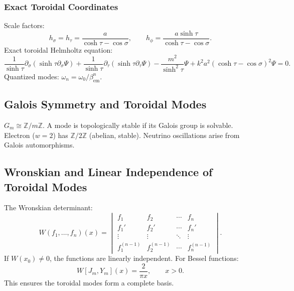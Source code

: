 \documentclass[12pt, a4paper]{article}
\begin{document}
\subsubsection{Exact Toroidal Coordinates}
Scale factors:
\begin{equation}
h_\sigma = h_\tau = \frac{a}{\cosh\tau - \cos\sigma}, \qquad h_\phi = \frac{a\sinh\tau}{\cosh\tau - \cos\sigma}.
\label{eq:toroidal_scale}
\end{equation}
Exact toroidal Helmholtz equation:
\begin{equation}
\frac{1}{\sinh\tau} \partial_\sigma (\sinh\tau \partial_\sigma \Psi) + \frac{1}{\sinh\tau} \partial_\tau (\sinh\tau \partial_\tau \Psi) - \frac{m^2}{\sinh^2\tau} \Psi + k^2 a^2 (\cosh\tau - \cos\sigma)^2 \Psi = 0.
\label{eq:toroidal_helmholtz}
\end{equation}
Quantized modes: $\omega_n = \omega_0 / \beta_{\mathrm{em}}^n$.

\subsection{Galois Symmetry and Toroidal Modes}
$G_m \cong \mathbb{Z}/m\mathbb{Z}$. A mode is topologically stable if its Galois group is solvable. Electron ($w=2$) has $\mathbb{Z}/2\mathbb{Z}$ (abelian, stable). Neutrino oscillations arise from Galois automorphisms.

\subsection{Wronskian and Linear Independence of Toroidal Modes}
\label{sec:wronskian}
The Wronskian determinant:
\begin{equation}
W(f_1,\dots,f_n)(x) = 
\begin{vmatrix}
f_1 & f_2 & \cdots & f_n \\
f_1' & f_2' & \cdots & f_n' \\
\vdots & \vdots & \ddots & \vdots \\
f_1^{(n-1)} & f_2^{(n-1)} & \cdots & f_n^{(n-1)}
\end{vmatrix}.
\label{eq:wronskian_def}
\end{equation}
If $W(x_0) \neq 0$, the functions are linearly independent. For Bessel functions:
\begin{equation}
W[J_m, Y_m](x) = \frac{2}{\pi x}, \qquad x > 0.
\label{eq:bessel_wronskian}
\end{equation}
This ensures the toroidal modes form a complete basis.
\end{document}

